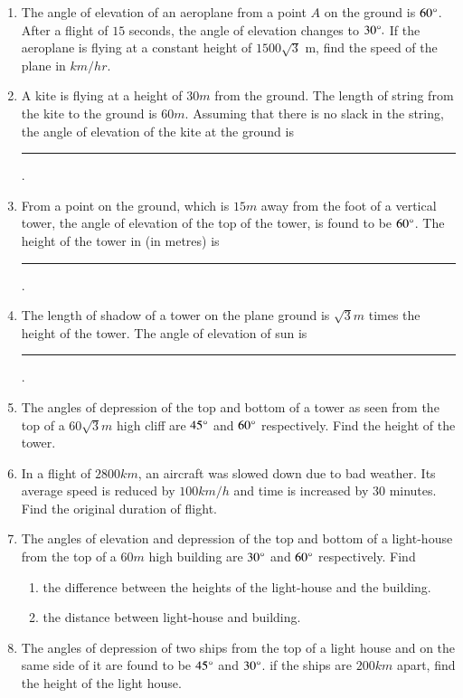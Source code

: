 \begin{enumerate}[label=\thesubsection.\arabic*.,ref=\thesubsection.\theenumi]
\begin{figure}[H]
	\caption{}
	\label{Figure 1}
\end{figure}
\hfill{}\item The angle of elevation of an aeroplane from a point $A$ on the ground is $60 \degree  $. After a flight of $15$ seconds, the angle of elevation changes to $  30 \degree.$ If the aeroplane is flying at a constant height of $1500\sqrt{3}$ m, find the speed of the plane in $km/hr$.
\hfill{}
\item A kite is flying at a height of $30 { m}$ from the ground. The length of string from the kite to the ground is $60 { m}$. Assuming that there is no slack in the string, the angle of elevation of the kite at the ground is \rule{1cm}{0.1pt}. 
\hfill{}\item From a point on the ground, which is $15{ m}$ away from the foot of a vertical tower, the angle of elevation of the top of the tower, is found to be $60\degree$. The height of the tower in (in metres) is 
\rule{1cm}{0.1pt}.
\hfill{}\item The length of shadow of a tower on the plane ground is $\sqrt 3 m$ times the height of the tower. The angle of elevation of sun is  \rule{1cm}{0.1pt}.
\hfill{}\item The angles of depression of the top and bottom of a tower as seen from the top of a $60\sqrt 3 { m}$ high cliff are $45\degree$ and $60\degree$ respectively. Find the height of the tower. 
\hfill{}\item In a flight of $2800 { km}$, an aircraft was slowed down due to bad weather. Its average speed is reduced by $100 { km/h}$ and time is increased by $30$ minutes. Find the original duration of flight. 
\hfill{}\item The angles of elevation and depression of the top and bottom of a light-house from the top of a $60 { m}$ high building are $30\degree$ and $60\degree$ respectively. Find 
\begin{enumerate}
\item the difference between the heights of the light-house and the building. 
\item the distance between light-house and building. 
\end{enumerate}
\hfill{}\item The angles of depression of two ships from the top of a light house and on the same side of it are found to be $45\degree$ and $30\degree$. if the ships are $200 { km}$ apart, find the height of the light house. 

\end{enumerate}
